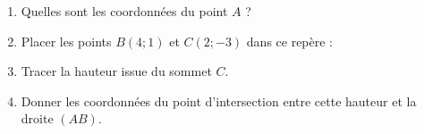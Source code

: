 
\begin{exercice}\label{exo2smath-0084}

\begin{center}
   
\end{center}

\begin{enumerate}
    \item
        Quelles sont les coordonnées du point \( A\) ?
    \item
        Placer les points \( B(4;1)\) et \( C(2;-3)\) dans ce repère :
    \item
        Tracer la hauteur issue du sommet \( C \).
    \item
        Donner les coordonnées du point d'intersection entre cette hauteur et la droite \( (AB)\).
\end{enumerate}

\end{exercice}
